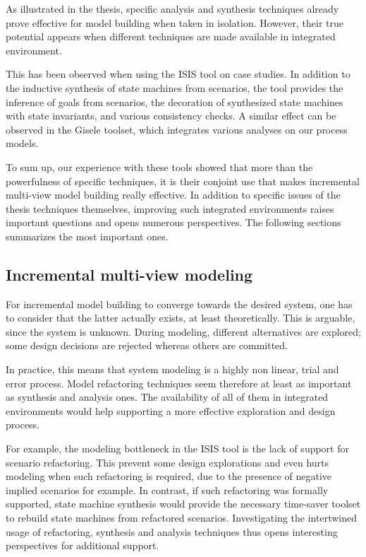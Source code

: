 As illustrated in the thesis, specific analysis and synthesis techniques already prove effective for model building when taken in isolation. However, their true potential appears when different techniques are made available in integrated environment.

This has been observed when using the ISIS tool on case studies. In addition to the inductive synthesis of state machines from scenarios, the tool provides the inference of goals from scenarios, the decoration of synthesized state machines with state invariants, and various consistency checks. A similar effect can be observed in the Gisele toolset, which integrates various analyses on our process models.

To sum up, our experience with these tools showed that more than the powerfulness of specific techniques, it is their conjoint use that makes incremental multi-view model building really effective. In addition to specific issues of the thesis techniques themselves, improving such integrated environments raises important questions and opens numerous perspectives. The following sections summarizes the most important ones.

\subsection*{Incremental multi-view modeling}

For incremental model building to converge towards the desired system, one has to consider that the latter actually exists, at least theoretically. This is arguable, since the system is unknown. During modeling, different alternatives are explored; some design decisions are rejected whereas others are committed.

In practice, this means that system modeling is a highly non linear, trial and error process. Model refactoring techniques seem therefore at least as important as synthesis and analysis ones. The availability of all of them in integrated environments would help supporting a more effective exploration and design process. 

For example, the modeling bottleneck in the ISIS tool is the lack of support for scenario refactoring. This prevent some design explorations and even hurts modeling when such refactoring is required, due to the presence of negative implied scenarios for example. In contrast, if such refactoring was formally supported, state machine synthesis would provide the necessary time-saver toolset to rebuild state machines from refactored scenarios. Investigating the intertwined usage of refactoring, synthesis and analysis techniques thus opens interesting perspectives for additional support.

